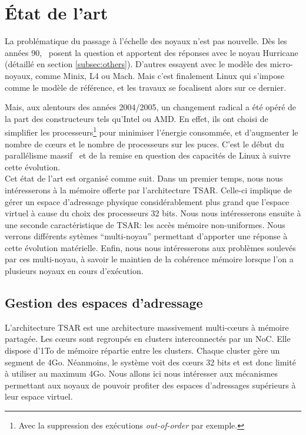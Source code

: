 \chapter{État de l’art}

  La problématique du passage à l’échelle des noyaux n’est pas nouvelle. Dès les
  années 90,~\citeauthor{unrau1995hierarchical} posent la question et apportent
  des réponses avec le noyau Hurricane (détaillé en section
  \ref{subsec:others}). D’autres essayent avec le modèle des micro-noyaux, comme
  Minix, L4 ou Mach. Mais c'est finalement Linux qui s’impose comme le modèle de
  référence, et les travaux se focalisent alors sur ce dernier.

  Mais, aux alentours des années 2004/2005, un changement radical a été opéré de
  la part des constructeurs tels qu’Intel ou AMD. En effet, ils ont choisi de
  simplifier les processeurs\footnote{Avec la suppression des exécutions
    \textit{out-of-order} par exemple.} pour minimiser l'énergie consommée, et
  d'augmenter le nombre de c\oe urs et le nombre de processeurs sur les
  puces. C'est le début du parallélisme massif~\citep{patterson2011parallel} et
  de la remise en question des capacités de Linux à suivre cette évolution.\\

  Cet état de l'art est organisé comme suit. Dans un premier temps, nous nous
  intéresserons à la mémoire offerte par l'architecture TSAR. Celle-ci implique
  de gérer un espace d'adressage physique considérablement plus grand que
  l'espace virtuel à cause du choix des processeurs 32 bits. Nous nous
  intéresserons ensuite à une seconde caractéristique de TSAR: les accès mémoire
  non-uniformes. Nous verrons différents sytèmes ``multi-noyau'' permettant
  d'apporter une réponse à cette évolution matérielle. Enfin, nous nous
  intéresserons aux problèmes soulevés par ces multi-noyau, à savoir le maintien
  de la cohérence mémoire lorsque l'on a plusieurs noyaux en cours d'exécution.


  \section{Gestion des espaces d'adressage}
  \label{sec:memory}    

    L'architecture TSAR est une architecture massivement multi-c\oe urs à
    mémoire partagée. Les c\oe urs sont regroupés en clusters interconnectés par
    un NoC. Elle dispose d'1To de mémoire répartie entre les clusters. Chaque
    cluster gère un segment de 4Go. Néanmoins, le système voit des c\oe urs 32
    bits et est donc limité à utiliser au maximum 4Go. Nous allons ici nous
    intéresser aux mécanismes permettant aux noyaux de pouvoir profiter des
    espaces d'adressages supérieurs à leur espace virtuel.

